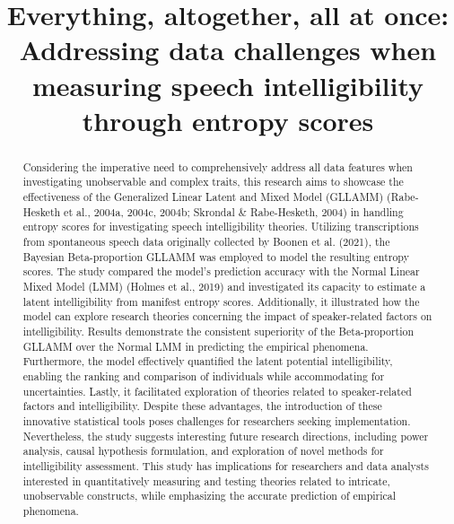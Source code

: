 \documentclass[
]{agujournal2019}
\begin{document}
\title{Everything, altogether, all at once: Addressing data challenges
when measuring speech intelligibility through entropy scores}



\begin{abstract}
Considering the imperative need to comprehensively address all data
features when investigating unobservable and complex traits, this
research aims to showcase the effectiveness of the Generalized Linear
Latent and Mixed Model (GLLAMM) (Rabe-Hesketh et al., 2004a, 2004c,
2004b; Skrondal \& Rabe-Hesketh, 2004) in handling entropy scores for
investigating speech intelligibility theories. Utilizing transcriptions
from spontaneous speech data originally collected by Boonen et al.
(2021), the Bayesian Beta-proportion GLLAMM was employed to model the
resulting entropy scores. The study compared the model's prediction
accuracy with the Normal Linear Mixed Model (LMM) (Holmes et al., 2019)
and investigated its capacity to estimate a latent intelligibility from
manifest entropy scores. Additionally, it illustrated how the model can
explore research theories concerning the impact of speaker-related
factors on intelligibility. Results demonstrate the consistent
superiority of the Beta-proportion GLLAMM over the Normal LMM in
predicting the empirical phenomena. Furthermore, the model effectively
quantified the latent potential intelligibility, enabling the ranking
and comparison of individuals while accommodating for uncertainties.
Lastly, it facilitated exploration of theories related to
speaker-related factors and intelligibility. Despite these advantages,
the introduction of these innovative statistical tools poses challenges
for researchers seeking implementation. Nevertheless, the study suggests
interesting future research directions, including power analysis, causal
hypothesis formulation, and exploration of novel methods for
intelligibility assessment. This study has implications for researchers
and data analysts interested in quantitatively measuring and testing
theories related to intricate, unobservable constructs, while
emphasizing the accurate prediction of empirical phenomena.
\end{abstract}
\end{document}
